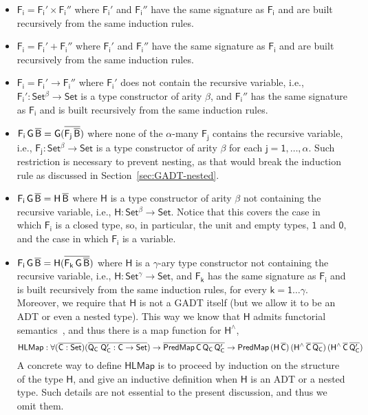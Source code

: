\documentclass[9pt]{entcs} \usepackage{entcsmacro}
\begin{document}
\begin{itemize}
\item $\mathsf{F_i = F_i' \times F_i''}$ where $\mathsf{F_i'}$ and $\mathsf{F_i''}$ have the same signature as $\mathsf{F_i}$ and are built recursively from the same induction rules.
\item $\mathsf{F_i = F_i' + F_i''}$ where $\mathsf{F_i'}$ and $\mathsf{F_i''}$ have the same signature as $\mathsf{F_i}$ and are built recursively from the same induction rules.
\item $\mathsf{F_i = F_i' \to F_i''}$
where $\mathsf{F_i'}$ does not contain the recursive variable,
i.e., $\mathsf{F_i' : Set^\beta \to Set}$ is a type constructor of arity $\mathsf{\beta}$,
and $\mathsf{F_i''}$ has the same signature as $\mathsf{F_i}$ and is built recursively from the same induction rules.
\item $\mathsf{F_i\,G\,\overline{B} = G(\overline{F_j\,\overline{B}})}$
where none of the $\mathsf{\alpha}$-many $\mathsf{F_j}$ contains the recursive variable,
i.e., $\mathsf{F_j : Set^\beta \to Set}$
is a type constructor of arity $\mathsf{\beta}$
for each $\mathsf{j = 1, \dots, \alpha}$.
Such restriction is necessary to prevent nesting,
as that would break the induction rule as discussed in Section~\ref{sec:GADT-nested}.
\item $\mathsf{F_i\,G\,\overline{B} = H\,\overline{B}}$
where $\mathsf{H}$ is a type constructor of arity $\mathsf{\beta}$ not containing the recursive variable,
i.e., $\mathsf{H : Set^\beta \to Set}$.
Notice that this covers the case in which $\mathsf{F_i}$ is a closed type,
so, in particular, the unit and empty types, $\mathsf{1}$ and $\mathsf{0}$,
and the case in which $\mathsf{F_i}$ is a variable.
\item $\mathsf{F_i\,G\,\overline{B} = H (\overline{F_k\,G\,\overline{B}})}$
where $\mathsf{H}$ is a $\mathsf{\gamma}$-ary type constructor not containing the recursive variable,
i.e., $\mathsf{H : Set^\gamma \to Set}$,
and $\mathsf{F_k}$ has the same signature as $\mathsf{F_i}$  and is built recursively from the same induction rules, for every $\mathsf{k = 1 \dots \gamma}$.
Moreover, we require that $\mathsf{H}$ is not a GADT itself (but we allow it to be an ADT or even a nested type).
This way we know that $\mathsf{H}$ admits functorial semantics~\cite{jp20}, and thus there is a map function for $\mathsf{H^{\wedge}}$,
\[
\mathsf{HLMap : \forall (\overline{C : Set}) (\overline{Q_C\;Q_C' : C \to Set})
	\to \overline{PredMap\,C\,Q_C\,Q_C'}
	\to PredMap\,(H\,\overline{C})\,(H^{\wedge}\,\overline{C}\,\overline{Q_C})\,(H^{\wedge}\,\overline{C}\,\overline{Q_C'})}
\]
A concrete way to define $\mathsf{HLMap}$ is to proceed by induction on the structure of the type $\mathsf{H}$,
and give an inductive definition when $\mathsf{H}$ is an ADT or a nested type.
Such details are not essential to the present discussion, and thus we omit them.
\end{itemize}
\end{document}
